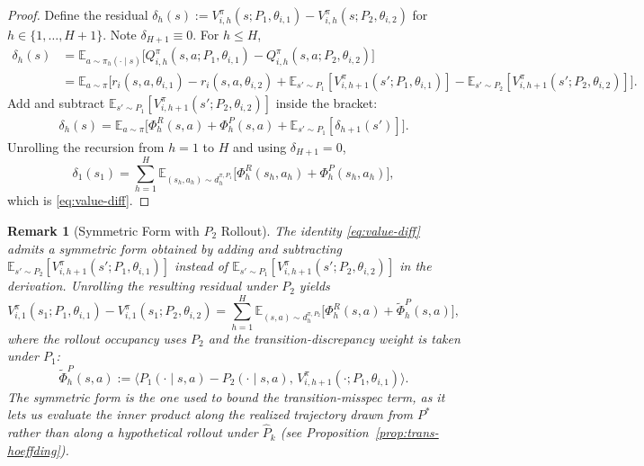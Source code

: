 \documentclass{article}
\newtheorem{remark}[theorem]{Remark}
\begin{document}
\begin{proof}
Define the residual $\delta_h(s) := V_{i,h}^\pi(s; P_1, \theta_{i,1}) - V_{i,h}^\pi(s; P_2, \theta_{i,2})$ for $h \in \{1, \ldots, H+1\}$. Note $\delta_{H+1} \equiv 0$. For $h \leq H$,
\begin{align}
\delta_h(s) &= \mathbb{E}_{a \sim \pi_h(\cdot \mid s)}\big[Q_{i,h}^\pi(s, a; P_1, \theta_{i,1}) - Q_{i,h}^\pi(s, a; P_2, \theta_{i,2})\big] \\
&= \mathbb{E}_{a \sim \pi}\big[r_i(s, a, \theta_{i,1}) - r_i(s, a, \theta_{i,2}) + \mathbb{E}_{s' \sim P_1}[V_{i,h+1}^\pi(s'; P_1, \theta_{i,1})] - \mathbb{E}_{s' \sim P_2}[V_{i,h+1}^\pi(s'; P_2, \theta_{i,2})]\big].
\end{align}
Add and subtract $\mathbb{E}_{s' \sim P_1}[V_{i,h+1}^\pi(s'; P_2, \theta_{i,2})]$ inside the bracket:
\begin{align}
\delta_h(s) = \mathbb{E}_{a \sim \pi}\big[\Phi_h^R(s,a) + \Phi_h^P(s,a) + \mathbb{E}_{s' \sim P_1}[\delta_{h+1}(s')]\big].
\end{align}
Unrolling the recursion from $h=1$ to $H$ and using $\delta_{H+1} = 0$,
\begin{equation}
\delta_1(s_1) = \sum_{h=1}^H \mathbb{E}_{(s_h, a_h) \sim d_h^{\pi, P_1}}\big[\Phi_h^R(s_h, a_h) + \Phi_h^P(s_h, a_h)\big],
\end{equation}
which is \eqref{eq:value-diff}.
\end{proof}

\begin{remark}[Symmetric Form with $P_2$ Rollout]
\label{rem:value-diff-symmetric}
The identity \eqref{eq:value-diff} admits a symmetric form obtained by adding and subtracting $\mathbb{E}_{s' \sim P_2}[V_{i,h+1}^\pi(s'; P_1, \theta_{i,1})]$ instead of $\mathbb{E}_{s' \sim P_1}[V_{i,h+1}^\pi(s'; P_2, \theta_{i,2})]$ in the derivation. Unrolling the resulting residual under $P_2$ yields
\begin{equation}
\label{eq:value-diff-symmetric}
V_{i,1}^{\pi}(s_1; P_1, \theta_{i,1}) - V_{i,1}^{\pi}(s_1; P_2, \theta_{i,2}) = \sum_{h=1}^{H} \mathbb{E}_{(s,a) \sim d_h^{\pi, P_2}}\big[\Phi_h^R(s,a) + \tilde\Phi_h^P(s,a)\big],
\end{equation}
where the rollout occupancy uses $P_2$ and the transition-discrepancy weight is taken under $P_1$:
\begin{equation}
\tilde\Phi_h^P(s,a) := \big\langle P_1(\cdot \mid s, a) - P_2(\cdot \mid s, a),\, V_{i,h+1}^\pi(\cdot; P_1, \theta_{i,1})\big\rangle.
\end{equation}
The symmetric form is the one used to bound the transition-misspec term, as it lets us evaluate the inner product along the realized trajectory drawn from $P^*$ rather than along a hypothetical rollout under $\hat{P}_k$ (see Proposition~\ref{prop:trans-hoeffding}).
\end{remark}
\end{document}
